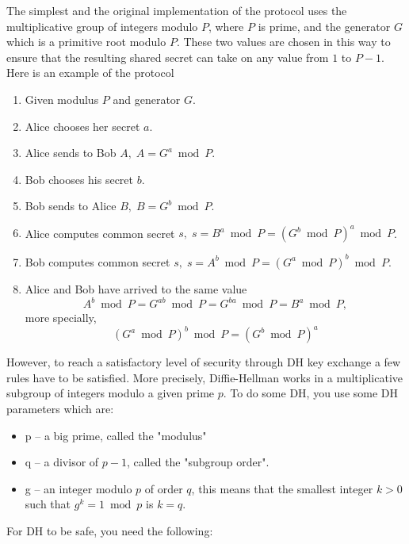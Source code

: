 The simplest and the original implementation of the protocol uses the multiplicative group of integers modulo $P$,
where $P$ is prime, and the generator $G$ which is a primitive root modulo $P$.
These two values are chosen in this way to ensure that the resulting shared secret can take on any value from $1$ to $P-1$.
Here is an example of the protocol
\begin{enumerate}
    \item Given modulus $P$ and generator $G$.
    \item Alice chooses her secret $a$.
    \item Alice sends to Bob $A, \; A = G^a \bmod P$.
    \item Bob chooses his secret $b$.
    \item Bob sends to Alice $B, \; B = G^b \bmod P$.
    \item Alice computes common secret $s, \; s = B^a \bmod P = (G^b \bmod P)^a \bmod P$.
    \item Bob computes common secret $s, \; s = A^b \bmod P = (G^a \bmod P)^b \bmod P$.
    \item Alice and Bob have arrived to the same value
    \[
        A^b \bmod P = G^{ab} \bmod P = G^{ba} \bmod P = B^a \bmod P,
    \]
    more specially,
    \[
        (G^a \bmod P)^b \bmod P = (G^b \bmod P)^a
    \]
\end{enumerate}
However, to reach a satisfactory level of security through DH key exchange a few rules have to be satisfied.
More precisely, Diffie-Hellman works in a multiplicative subgroup of integers modulo a given prime $p$.
To do some DH, you use some DH parameters which are:
\begin{itemize}
    \item p -- a big prime, called the "modulus"
    \item q -- a divisor of $p-1$, called the "subgroup order".
    \item g -- an integer modulo $p$ of order $q$, this means that the smallest integer $k > 0$ such that
    $g^k = 1 \bmod p$ is $k = q$.
\end{itemize}
For DH to be safe, you need the following:

